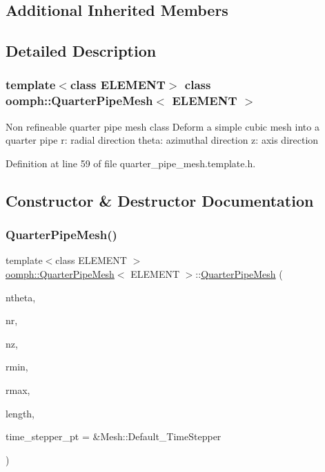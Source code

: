 \subsection*{Additional Inherited Members}


\subsection{Detailed Description}
\subsubsection*{template$<$class E\+L\+E\+M\+E\+NT$>$\newline
class oomph\+::\+Quarter\+Pipe\+Mesh$<$ E\+L\+E\+M\+E\+N\+T $>$}

Non refineable quarter pipe mesh class Deform a simple cubic mesh into a quarter pipe r\+: radial direction theta\+: azimuthal direction z\+: axis direction 

Definition at line 59 of file quarter\+\_\+pipe\+\_\+mesh.\+template.\+h.



\subsection{Constructor \& Destructor Documentation}
\mbox{\label{classoomph_1_1QuarterPipeMesh_a453b84a80ccde867b8526e538135f43b}} 
\subsubsection{\texorpdfstring{Quarter\+Pipe\+Mesh()}{QuarterPipeMesh()}}
{\footnotesize\ttfamily template$<$class E\+L\+E\+M\+E\+NT $>$ \\
\hyperlink{classoomph_1_1QuarterPipeMesh}{oomph\+::\+Quarter\+Pipe\+Mesh}$<$ E\+L\+E\+M\+E\+NT $>$\+::\hyperlink{classoomph_1_1QuarterPipeMesh}{Quarter\+Pipe\+Mesh} (\begin{DoxyParamCaption}\item[{const unsigned \&}]{ntheta,  }\item[{const unsigned \&}]{nr,  }\item[{const unsigned \&}]{nz,  }\item[{const double \&}]{rmin,  }\item[{const double \&}]{rmax,  }\item[{const double \&}]{length,  }\item[{Time\+Stepper $\ast$}]{time\+\_\+stepper\+\_\+pt = {\ttfamily \&Mesh\+:\+:Default\+\_\+TimeStepper} }\end{DoxyParamCaption})}



